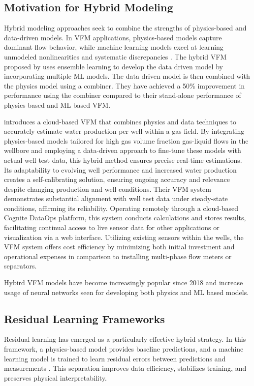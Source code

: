 \documentclass[12pt,APA]{uomthesis}
\begin{document}
\subsection{Motivation for Hybrid Modeling}
Hybrid modeling approaches seek to combine the strengths of physics-based and data-driven models. In VFM applications, physics-based models capture dominant flow behavior, while machine learning models excel at learning unmodeled nonlinearities and systematic discrepancies \citep{hotvedt2020developing}.
The hybrid VFM proposed by \citep{ishak2022virtual} uses ensemble learning to develop the data driven model by incorporating multiple ML models. The data driven model is then combined with the physics model using a combiner. They have achieved a 50\% improvement in performance using the combiner compared to their stand-alone performance of physics based and ML based VFM. 

\citep{nemoto2023cloud} introduces a cloud-based VFM that combines physics and data techniques to accurately estimate water production per well within a gas field. By integrating physics-based models tailored for high gas volume fraction gas-liquid flows in the wellbore and employing a data-driven approach to fine-tune these models with actual well test data, this hybrid method ensures precise real-time estimations. Its adaptability to evolving well performance and increased water production creates a self-calibrating solution, ensuring ongoing accuracy and relevance despite changing production and well conditions. Their VFM system demonstrates substantial alignment with well test data under steady-state conditions, affirming its reliability. Operating remotely through a cloud-based Cognite DataOps platform, this system conducts calculations and stores results, facilitating continual access to live sensor data for other applications or visualization via a web interface. Utilizing existing sensors within the wells, the VFM system offers cost efficiency by minimizing both initial investment and operational expenses in comparison to installing multi-phase flow meters or separators.

Hybird VFM models have become increasingly popular since 2018 and increase usage of neural networks seen for developing both physics and ML based models.

\subsection{Residual Learning Frameworks}
Residual learning has emerged as a particularly effective hybrid strategy. In this framework, a physics-based model provides baseline predictions, and a machine learning model is trained to learn residual errors between predictions and measurements \citep{bikmukhametov2020combining}. This separation improves data efficiency, stabilizes training, and preserves physical interpretability.
\end{document}
